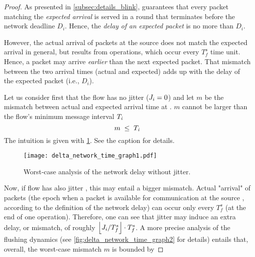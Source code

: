 \begin{proof}%
As presented in \cref{subsec:details_blink}, \blink guarantees that every packet matching the \emph{expected arrival} is served in a round that terminates before the network deadline $D_i$. Hence, the \emph{delay of an expected packet} is no more than $D_i$.

However, the actual arrival of packets at the source \cpsrc does not match the expected arrival in general, but results from \opflush operations, which occur every $T_f^s$ time unit.
Hence, a packet may arrive \emph{earlier} than the next expected packet. That mismatch between the two arrival times (actual and expected) adds up with the delay of the expected packet (i.e., $D_i$).

Let us consider first that the flow \flowi has no jitter (\ie $\jitteri =0$) and let $m$ be the mismatch between actual and expected arrival time at \cpsrc. $m$ cannot be larger than the flow's minimum message interval $\periodi$
\[
m \;\leq\; \periodi
\]
The intuition is given with \cref{fig:delta_network_time_graph1}. See the caption for details.

\begin{figure}[h!]
\centering
\texttt{[image: delta\_network\_time\_graph1.pdf]}
\caption{Worst-case analysis of the network delay without jitter.
}
\label{fig:delta_network_time_graph1}
\end{figure}


Now, if flow \flowi has also jitter \jitteri, this may entail a bigger mismatch. Actual "arrival" of packets (\ie the epoch when a packet is available for communication at the source \cpsrc, according to the definition of the network delay) can occur only every $T_f^s$ (\ie at the end of one \opflush operation). Therefore, one can see that jitter may induce an extra delay, or mismatch, of roughly $\floor*{\jitteri/T_f^s}\cdot T_f^s$. A more precise analysis of the flushing dynamics (see \cref{fig:delta_network_time_graph2} for details) entails that, overall, the worst-case mismatch $m$ is bounded by


\end{proof}

